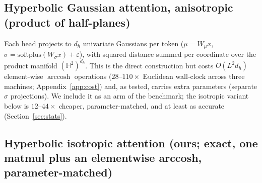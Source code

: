 \documentclass[11pt]{article}
\DeclareMathOperator{\arccosh}{arccosh}
\begin{document}
\subsection{Hyperbolic Gaussian attention, anisotropic (product of half-planes)}\label{sec:aniso}

Each head projects to $d_h$ univariate Gaussians per token ($\mu = W_\mu x$, $\sigma = \mathrm{softplus}(W_\sigma x) + \varepsilon$), with squared distance summed per coordinate over the product manifold $(\mathbb{H}^2)^{d_h}$. This is the direct construction but costs $O(L^2 d_h)$ element-wise $\arccosh$ operations ($28$--$110\times$ Euclidean wall-clock across three machines; Appendix~\ref{app:cost}) and, as tested, carries extra parameters (separate $\sigma$ projections). We include it as an arm of the benchmark; the isotropic variant below is $12$--$44\times$ cheaper, parameter-matched, and at least as accurate (Section~\ref{sec:stats}).

\subsection{Hyperbolic isotropic attention (ours; exact, one matmul plus an elementwise arccosh, parameter-matched)}\label{sec:iso}
\end{document}
